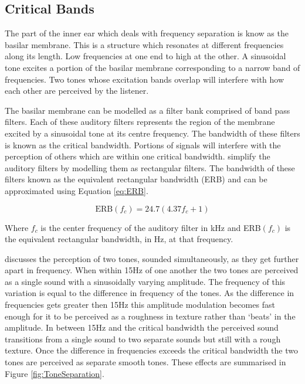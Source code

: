 	\subsection{Critical Bands}
	\label{sec:Timbre-PsychoacousticPrinciples-CriticalBands}
		The part of the inner ear which deals with frequency separation is know as the basilar membrane. This is a
		structure which resonates at different frequencies along its length. Low frequencies at one end to high at
		the other. A sinusoidal tone excites a portion of the basilar membrane corresponding to a narrow band of
		frequencies. Two tones whose excitation bands overlap will interfere with how each other are perceived by
		the listener.

		The basilar membrane can be modelled as a filter bank comprised of band pass filters. Each of these
		auditory filters represents the region of the membrane excited by a sinusoidal tone at its centre
		frequency. The bandwidth of these filters is known as the critical bandwidth. Portions of signals will
		interfere with the perception of others which are within one critical bandwidth.
		\citet{glasberg1990derivation} simplify the auditory filters by modelling them as rectangular filters. The
		bandwidth of these filters known as the equivalent rectangular bandwidth (ERB) and can be approximated
		using Equation \ref{eq:ERB}.

		\begin{equation}
			\textrm{ERB}(f_{c}) = 24.7(4.37f_{c} + 1)
			\label{eq:ERB}
		\end{equation}

		Where $f_{c}$ is the center frequency of the auditory filter in kHz and ERB$(f_{c})$ is the equivalent
		rectangular bandwidth, in Hz, at that frequency.

		\citet{howard2009acoustics} discusses the perception of two tones, sounded simultaneously, as they get
		further apart in frequency. When within 15Hz of one another the two tones are perceived as a single sound
		with a sinusoidally varying amplitude. The frequency of this variation is equal to the difference in
		frequency of the tones. As the difference in frequencies gets greater then 15Hz this amplitude modulation
		becomes fast enough for it to be perceived as a roughness in texture rather than `beats' in the amplitude.
		In between 15Hz and the critical bandwidth the perceived sound transitions from a single sound to two
		separate sounds but still with a rough texture. Once the difference in frequencies exceeds the critical
		bandwidth the two tones are perceived as separate smooth tones. These effects are summarised in Figure
		\ref{fig:ToneSeparation}.

